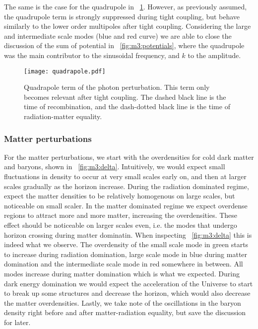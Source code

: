     The same is the case for the quadrupole in ~\cref{fig:m3:quadrapole}. However, as previously assumed, the quadrupole term is strongly suppressed during tight coupling, but behave similarly to the lower order multipoles after tight coupling. Considering the large and intermediate scale modes (blue and red curve) we are able to close the discussion of the sum of potential in ~\cref{fig:m3:potentials}, where the quadrupole was the main contributor to the sinusoidal frequency, and $k$ to the amplitude. 

    \begin{figure}
        \texttt{[image: quadrapole.pdf]}
        \caption{Quadrapole term of the photon perturbation. This term only becomes relevant after tight coupling. The dashed black line is the time of recombination, and the dash-dotted black line is the time of radiation-matter equality.}
        \label{fig:m3:quadrapole}
    \end{figure}

\subsubsection{Matter perturbations}

    For the matter perturbations, we start with the overdensities for cold dark matter and baryons, shown in ~\cref{fig:m3:delta}. Intuitively, we would expect small fluctuations in density to occur at very small scales early on, and then at larger scales gradually as the horizon increase. During the radiation dominated regime, expect the matter densities to be relatively homogenous on large scales, but noticeable on small scaler. In the matter dominated regime we expect overdense regions to attract more and more matter, increasing the overdensities. These effect should be noticeable on larger scales even, i.e. the modes that undergo horizon crossing during matter dominatin. When inspecting ~\cref{fig:m3:delta} this is indeed what we observe. The overdensity of the small scale mode in green starts to increase during radiation domination, large scale mode in blue during matter domination and the intermediate scale mode in red somewhere in between. All modes increase during matter domination which is what we expected. During dark energy domination we would expect the acceleration of the Universe to start to break up some structures and decrease the horizon, which would also decrease the matter overdensities. Lastly, we take note of the oscillations in the baryon density right before and after matter-radiation equality, but save the discussion for later. 

